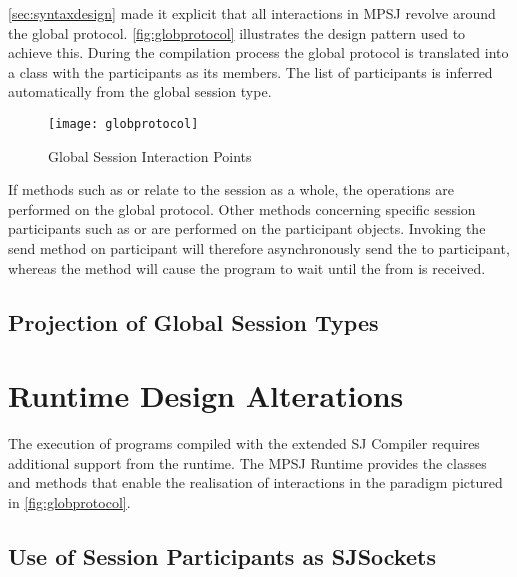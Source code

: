 \autoref{sec:syntaxdesign} made it explicit that all interactions in MPSJ revolve around the global protocol. \autoref{fig:globprotocol} illustrates the design pattern used to achieve this. During the compilation process the global protocol is translated into a class with the participants as its members. The list of participants is inferred automatically from the global session type.

\begin{figure}[H]
\begin{center}
\texttt{[image: globprotocol]}
\caption{Global Session Interaction Points}
\label{fig:globprotocol}
\end{center}
\end{figure}

If methods such as  or  relate to the session as a whole, the operations are performed on the global protocol. Other methods concerning specific session participants such as  or  are performed on the participant objects. Invoking the send method on participant  will therefore asynchronously send the  to participant, whereas the method  will cause the program to wait until the  from  is received.


\subsection{Projection of Global Session Types}




\section{Runtime Design Alterations}

The execution of programs compiled with the extended SJ Compiler requires additional support from the runtime. The MPSJ Runtime provides the classes and methods that enable the realisation of interactions in the paradigm pictured in \autoref{fig:globprotocol}.

\subsection{Use of Session Participants as SJSockets}

